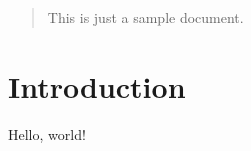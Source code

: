 \documentclass[12pt]{article}
\begin{document}
\maketitle

\begin{abstract}
    This is just a sample document.
\end{abstract}

\section{Introduction}

Hello, world!
\end{document}
